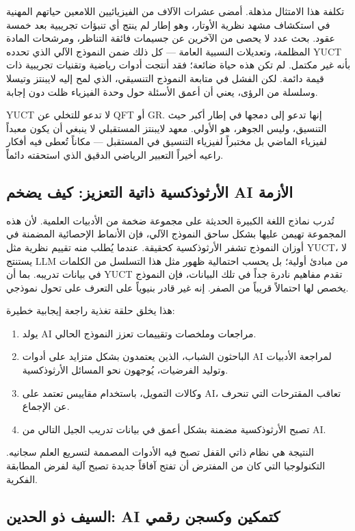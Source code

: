 \documentclass[12pt,a4paper]{article}
\begin{document}
	تكلفة هذا الامتثال مذهلة. أمضى عشرات الآلاف من الفيزيائيين اللامعين حياتهم المهنية في استكشاف مشهد نظرية الأوتار، وهو إطار لم ينتج أي تنبؤات تجريبية بعد خمسة عقود. بحث عدد لا يحصى من الآخرين عن جسيمات فائقة التناظر، ومرشحات المادة المظلمة، وتعديلات النسبية العامة — كل ذلك ضمن النموذج الآلي الذي تحدده YUCT بأنه غير مكتمل. لم تكن هذه حياة ضائعة؛ فقد أنتجت أدوات رياضية وتقنيات تجريبية ذات قيمة دائمة. لكن الفشل في متابعة النموذج التنسيقي، الذي لمح إليه لايبنتز وتيسلا وسلسلة من الرؤى، يعني أن أعمق الأسئلة حول وحدة الفيزياء ظلت دون إجابة.
	
	YUCT لا تدعو للتخلي عن QFT أو GR. إنها تدعو إلى دمجها في إطار أكبر حيث التنسيق، وليس الجوهر، هو الأولي. معهد لايبنتز المستقبلي لا ينبغي أن يكون معبداً لفيزياء الماضي بل مختبراً لفيزياء التنسيق في المستقبل — مكاناً تُعطى فيه أفكار راعيه أخيراً التعبير الرياضي الدقيق الذي استحقته دائماً.
	
	\subsection{الأرثوذكسية ذاتية التعزيز: كيف يضخم AI الأزمة}
	
	تُدرب نماذج اللغة الكبيرة الحديثة على مجموعة ضخمة من الأدبيات العلمية. لأن هذه المجموعة تهيمن عليها بشكل ساحق النموذج الآلي، فإن الأنماط الإحصائية المضمنة في أوزان النموذج تشفر الأرثوذكسية كحقيقة. عندما يُطلب منه تقييم نظرية مثل YUCT، لا يستنتج LLM من مبادئ أولية؛ بل يحسب احتمالية ظهور مثل هذا التسلسل من الكلمات في بيانات تدريبه. بما أن YUCT تقدم مفاهيم نادرة جداً في تلك البيانات، فإن النموذج يخصص لها احتمالاً قريباً من الصفر. إنه غير قادر بنيوياً على التعرف على تحول نموذجي.
	
	هذا يخلق حلقة تغذية راجعة إيجابية خطيرة:
	\begin{enumerate}
		\item يولد AI مراجعات وملخصات وتقييمات تعزز النموذج الحالي.
		\item الباحثون الشباب، الذين يعتمدون بشكل متزايد على أدوات AI لمراجعة الأدبيات وتوليد الفرضيات، يُوجهون نحو المسائل الأرثوذكسية.
		\item وكالات التمويل، باستخدام مقاييس تعتمد على AI، تعاقب المقترحات التي تنحرف عن الإجماع.
		\item تصبح الأرثوذكسية مضمنة بشكل أعمق في بيانات تدريب الجيل التالي من AI.
	\end{enumerate}
	النتيجة هي نظام ذاتي القفل تصبح فيه الأدوات المصممة لتسريع العلم سجانيه. التكنولوجيا التي كان من المفترض أن تفتح آفاقاً جديدة تصبح آلية لفرض المطابقة الفكرية.
	
	\subsection{السيف ذو الحدين: AI كتمكين وكسجن رقمي}
	
\end{document}
